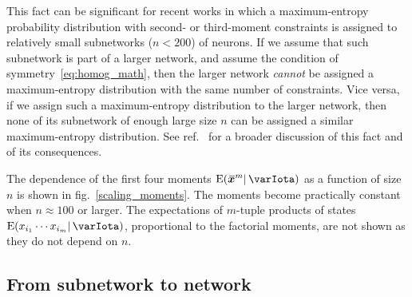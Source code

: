 \documentclass{article}
\theoremstyle{remark}
\theoremstyle{innote}
\newcommand*{\citep}{\parencites}
\renewcommand*{\|}{\mathpunct{|}}%
\newcommand*{\fig}{fig.}%
\newcommand*{\eg}{{e.g.}}
\newcommand*{\E}{\mathrm{E}}
\DeclarePairedDelimiter\expp{(}{)}
\newcommand*{\expe}{\E\expp}%
\theoremstyle{simple}
\newcommand*{\widebar}[1]{{\mkern1.5mu\skew{2}\overline{\mkern-1.5mu#1\mkern-1.5mu}\mkern 1.5mu}}
\newcommand*{\sav}{\widebar} %
\newcommand*{\yxx}{x}%
\newcommand*{\yx}{\bm{\yxx}}%
\newcommand*{\yxs}{\sav{\yx}}%
\newcommand*{\yH}{\varIota}
\begin{document}
This fact can be significant for recent works
\citep[\eg,][]{schneidmanetal2006,shlensetal2006,tkaciketal2006,marreetal2009,tkaciketal2009,ganmoretal2011,shimazakietal2012,tkaciketal2013,shimazakietal2015}
in which a maximum-entropy probability distribution with second- or
third-moment constraints is assigned to relatively small subnetworks
($n < 200$) of neurons. If we assume that such subnetwork is part of a
larger network, and assume the condition of symmetry~\eqref{eq:homog_math},
then the larger network \emph{cannot} be assigned a maximum-entropy
distribution with the same number of constraints. Vice versa, if we assign
such a maximum-entropy distribution to the larger network, then none of its
subnetwork of enough large size $n$ can be assigned a similar
maximum-entropy distribution. See ref.~\citep{rostamietal2016} for a
broader discussion of this fact and of its consequences.

\medskip

The dependence of the first four moments $\expe{\yxs^m \| \yH}$ as a
function of size $n$ is shown in \fig~\ref{scaling_moments}. The moments
become practically constant when $n \approx 100$ or larger. The
expectations of $m$-tuple products of states
$\expe{x_{i_1}\dotsm x_{i_m} \| \yH}$, proportional to the factorial
moments, are not shown as they do not depend on $n$.


\subsection{From subnetwork to network}
\label{sec:from_sub_to_full}
\end{document}
